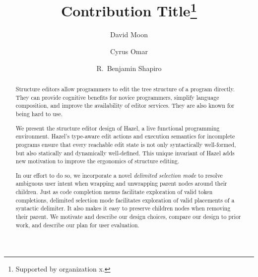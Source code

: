 \documentclass[runningheads]{llncs}
\newcommand{\Hazel}{\textsf{Hazel}\xspace}
\begin{document}
%
\title{Contribution Title\thanks{Supported by organization x.}}
%
%
\author{David Moon \and
Cyrus Omar \and
R.~Benjamin Shapiro}
%
%
%
\maketitle              %
%
\begin{abstract}
Structure editors allow programmers to edit the tree structure of a program directly.
They can provide cognitive benefits for novice programmers, simplify language composition, 
and improve the availability of editor services. They are also known for being hard 
to use.

We present the structure editor design of \Hazel, a live functional programming
environment. \Hazel's type-aware edit actions and execution semantics for incomplete programs ensure that every reachable edit state is not only syntactically well-formed, but also statically and dynamically well-defined. This unique invariant of \Hazel adds new motivation to improve the ergonomics of structure editing. 

In our effort to do so, we incorporate a novel \emph{delimited selection mode} to resolve ambiguous user intent when wrapping and unwrapping parent nodes around their children. Just as code completion menus facilitate exploration of valid token completions, delimited selection mode facilitates exploration of valid placements of a syntactic delimiter. It also makes it easy to preserve children nodes when removing their parent. We motivate and describe our design choices, compare our design to prior work, and describe our plan for user evaluation.
\end{abstract}
%
%
%
\end{document}
